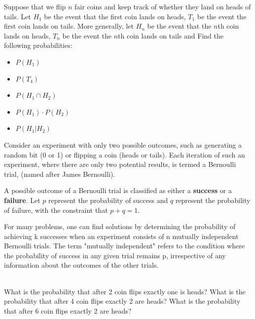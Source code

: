 \begin{exmp} Suppose that we flip $n$ fair coins and keep track of whether they land on heads of tails. 
Let $H_1$ be the event that the first coin lands on heads, $T_1$ be the event the first coin lands on tails. More generally, let $H_n$ be the event that the $n$th coin lands on heads, $T_n$ be the event the $n$th coin lands on tails and 
\newline
Find the following probabilities:
\begin{itemize}
\item $P(H_1)$
\vspace{1cm}
\item $P(T_4)$
\vspace{1cm}
\item $P(H_1\cap H_2)$
\vspace{1cm}
\item $P(H_1)\cdot P(H_2)$
\vspace{1cm}
\item $P(H_1|H_2)$
\vspace{1cm}
\end{itemize}


\end{exmp}
\begin{defn}
Consider an experiment with only two possible outcomes, such as generating a random bit (0 or 1) or flipping a coin (heads or tails). Each iteration of such an experiment, where there are only two potential results, is termed a Bernoulli trial, (named after James Bernoulli).

A possible outcome of a Bernoulli trial is classified as either a \textbf{success} or a \textbf{failure}. Let $p$ represent the probability of success and $q$ represent the probability of failure, with the constraint that $p + q = 1$.

For many problems, one can find solutions by determining the probability of achieving k successes when an experiment consists of n mutually independent Bernoulli trials. The term "mutually independent" refers to the condition where the probability of success in any given trial remains p, irrespective of any information about the outcomes of the other trials.
\end{defn}
\begin{exmp}$ $\\
What is the probability that after 2 coin flips exactly one is heads?
\newline
\vspace{1cm}
\newline
What is the probability that after 4 coin flips exactly 2 are heads?
\newline
\vspace{1cm}
\newline
What is the probability that after 6 coin flips exactly 2 are heads?
\newline
\vspace{1cm}

\end{exmp}

